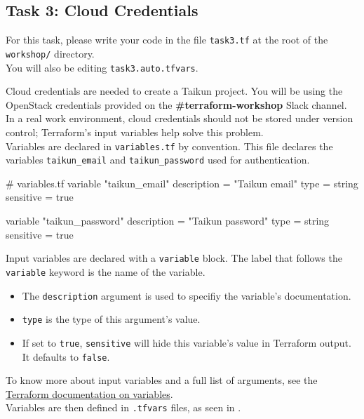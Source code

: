 \subsection{Task 3: Cloud Credentials}\label{sec:task3}

\begin{note}
For this task, please write your code in the file \texttt{task3.tf}
at the root of the \texttt{workshop/} directory.\\
You will also be editing \texttt{task3.auto.tfvars}.
\end{note}

Cloud credentials are needed to create a Taikun project.
You will be using the OpenStack credentials provided on the \textbf{\#terraform-workshop}
Slack channel. In a real work environment, cloud credentials should not be stored under version control;
Terraform's input variables help solve this problem.\\

Variables are declared in \texttt{variables.tf} by convention.
This file declares the variables \texttt{taikun\_email} and
\texttt{taikun\_password} used for authentication.
\begin{tf}
# variables.tf
variable "taikun_email" {
  description = "Taikun email"
  type        = string
  sensitive   = true
}

variable "taikun_password" {
  description = "Taikun password"
  type        = string
  sensitive   = true
}
\end{tf}

\begin{tip}
  Input variables are declared with a \texttt{variable} block.
  The label that follows the \texttt{variable} keyword is the name of the variable.

  \begin{itemize}
    \item The \texttt{description} argument is used to specifiy the variable's documentation.
    \item \texttt{type} is the type of this argument's value.
    \item If set to \texttt{true}, \texttt{sensitive} will hide this variable's value in Terraform output. It defaults to \texttt{false}.
  \end{itemize}

  To know more about input variables and a full list of arguments,
  see the \href{https://www.terraform.io/docs/language/values/variables.html}{Terraform documentation on variables}.\\

  Variables are then defined in \texttt{.tfvars} files, as seen in .\\
\end{tip}

